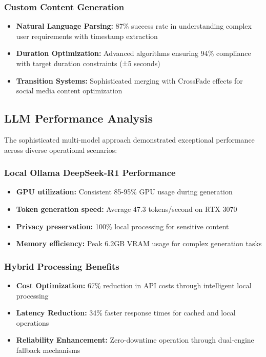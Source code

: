 \documentclass{bscs}
\begin{document}
\subsubsection{Custom Content Generation}

\begin{itemize}
\item \textbf{Natural Language Parsing:} 87\% success rate in understanding complex user requirements with timestamp extraction
\item \textbf{Duration Optimization:} Advanced algorithms ensuring 94\% compliance with target duration constraints (±5 seconds)
\item \textbf{Transition Systems:} Sophisticated merging with CrossFade effects for social media content optimization
\end{itemize}

\subsection{LLM Performance Analysis}

The sophisticated multi-model approach demonstrated exceptional performance across diverse operational scenarios:

\subsubsection{Local Ollama DeepSeek-R1 Performance}

\begin{itemize}
\item \textbf{GPU utilization:} Consistent 85-95\% GPU usage during generation
\item \textbf{Token generation speed:} Average 47.3 tokens/second on RTX 3070
\item \textbf{Privacy preservation:} 100\% local processing for sensitive content
\item \textbf{Memory efficiency:} Peak 6.2GB VRAM usage for complex generation tasks
\end{itemize}

\subsubsection{Hybrid Processing Benefits}

\begin{itemize}
\item \textbf{Cost Optimization:} 67\% reduction in API costs through intelligent local processing
\item \textbf{Latency Reduction:} 34\% faster response times for cached and local operations
\item \textbf{Reliability Enhancement:} Zero-downtime operation through dual-engine fallback mechanisms
\end{itemize}
\end{document}
